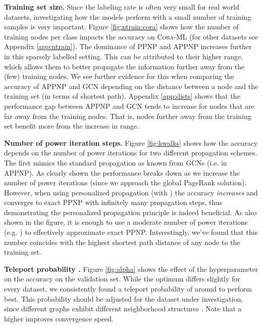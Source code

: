 \documentclass{article} \usepackage{iclr2019_conference,times}
\begin{document}
\textbf{Training set size.} Since the labeling rate is often very small for real world datasets, investigating how the models perform with a small number of training samples is very important. Figure \ref{fig:ntrain:cora} shows how the number of training nodes per class  impacts the accuracy on \textsc{Cora-ML} (for other datasets see Appendix \ref{app:ntrain}). The dominance of PPNP and APPNP increases further in this sparsely labelled setting. This can be attributed to their higher range, which allows them to better propagate the information further away from the (few) training nodes.
We see further evidence for this when comparing the accuracy of APPNP and GCN depending on the distance between a node and the training set (in terms of shortest path). Appendix \ref{app:dists} shows that the performance gap between APPNP and GCN tends to increase for nodes that are far away from the training nodes. That is, nodes further away from the training set benefit more from the increase in range.


\textbf{Number of power iteration steps.}
Figure \ref{fig:kwalks} shows how the accuracy depends on the number of power iterations for two different propagation schemes. The first mimics the standard propagation as known from GCNs (i.e.  in APPNP). As clearly shown the performance breaks down as we increase the number of power iterations  (since we approach the global PageRank solution). However, when using personalized propagation (with ) the accuracy \textit{increases} and converges to exact PPNP with infinitely many propagation steps, thus demonstrating the personalized propagation principle is indeed beneficial. As also shown in the figure, it is enough to use a moderate number of power iterations (e.g. ) to effectively approximate exact PPNP. Interestingly, we've found that this number coincides with the highest shortest path distance of any node to the training set.

\textbf{Teleport probability .} Figure \ref{fig:alpha} shows the effect of the hyperparameter  on the accuracy on the validation set. While the optimum differs slightly for every dataset, we consistently found a teleport probability of around  to perform best. This probability should be adjusted for the dataset under investigation, since different graphs exhibit different neighborhood structures \citep{grover_node2vec:_2016,abu-el-haija_watch_2018}. Note that a higher  improves convergence speed.
\end{document}
